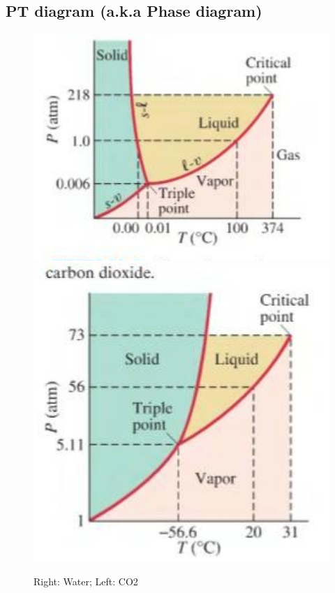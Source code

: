 \documentclass[12 pt, twoside, a4paper] {article}
\begin{document}
\subsection{PT diagram (a.k.a Phase diagram)}
\begin{figure}[h!]
\center
\includegraphics[scale=0.3]{PhaseDiagramWater}
\includegraphics[scale=0.3]{PhaseDiagramCO2} 
\vspace{-10pt}
\caption{Right: Water; Left: CO2}
\end{figure}
\end{document}

